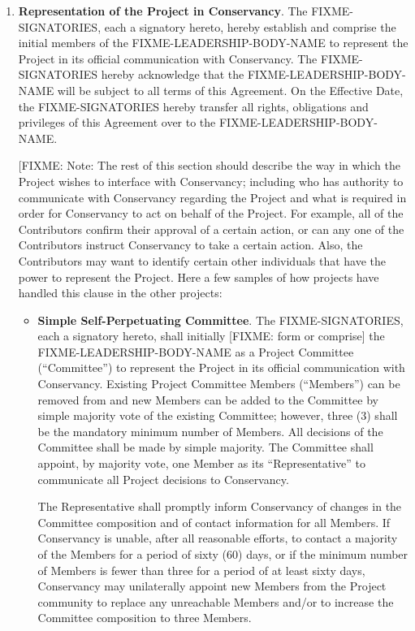 \documentclass[letterpaper,12pt]{article}
\newcommand{\signatories}{FIXME-SIGNATORIES\xspace}
\newcommand{\leadershipbody}{FIXME-LEADERSHIP-BODY-NAME\xspace}
\begin{document}
\begin{enumerate}[label=\arabic*.,ref=\S~\arabic*]
\item \textbf{Representation of the Project in Conservancy}. \label{Representation}The
\signatories, each a signatory hereto, hereby establish and comprise
the initial members of the \leadershipbody
to represent the Project in its official communication with Conservancy.
The \signatories hereby acknowledge that the \leadershipbody
will be subject to all terms of this Agreement.
On the Effective Date, the \signatories hereby transfer all
rights, obligations and privileges of this Agreement over to the
\leadershipbody.

[FIXME: Note: The rest of this section should describe the way in which the
Project wishes to interface with Conservancy; including who has
authority to communicate with Conservancy regarding the Project
and what is required in order for Conservancy to act on behalf
of the Project. For example, all of the Contributors confirm their
approval of a certain action, or can any one of the Contributors instruct
Conservancy to take a certain action. Also, the Contributors may
want to identify certain other individuals that have the power to
represent the Project. Here a few samples of how projects have handled
this clause in the other projects:

\begin{itemize}
\item \textbf{Simple Self-Perpetuating Committee}. The \signatories,
each a signatory hereto, shall initially [FIXME: form or comprise]
the \leadershipbody as a Project Committee (``Committee'')
to represent the Project in its official communication with Conservancy.
Existing Project Committee Members (``Members'') can be removed
from and new Members can be added to the Committee by simple majority
vote of the existing Committee; however, three (3) shall be the mandatory
minimum number of Members. All decisions of the Committee shall be
made by simple majority. The Committee shall appoint, by majority
vote, one Member as its ``Representative'' to communicate all Project
decisions to Conservancy.


The Representative shall promptly inform Conservancy of changes in
the Committee composition and of contact information for all Members.
If Conservancy is unable, after all reasonable efforts, to contact
a majority of the Members for a period of sixty (60) days, or if the
minimum number of Members is fewer than three for a period of at least
sixty days, Conservancy may unilaterally appoint new Members from
the Project community to replace any unreachable Members and/or to
increase the Committee composition to three Members.


\end{itemize}
\end{enumerate}
\end{document}
